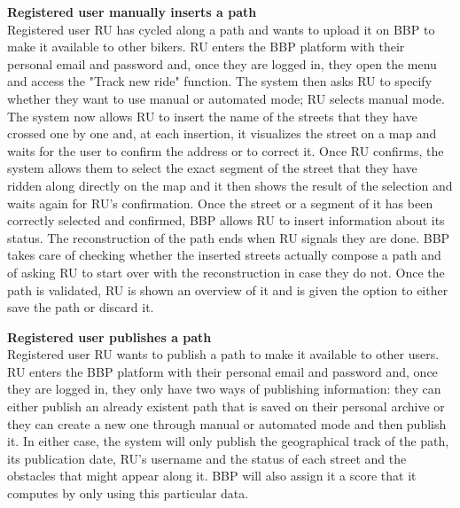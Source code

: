 \documentclass{article}
\begin{document}
\vspace{0.5cm}
\noindent
\textbf{Registered user manually inserts a path} \\
Registered user RU has cycled along a path and wants to upload it on BBP to make it available to other bikers. RU enters the BBP platform with their personal email and password and, once they are logged in, they open the menu and access the "Track new ride" function. The system then asks RU to specify whether they want to use manual or automated mode; RU selects manual mode. The system now allows RU to insert the name of the streets that they have crossed one by one and, at each insertion, it visualizes the street on a map and waits for the user to confirm the address or to correct it. Once RU confirms, the system allows them to select the exact segment of the street that they have ridden along directly on the map and it then shows the result of the selection and waits again for RU's confirmation. Once the street or a segment of it has been correctly selected and confirmed, BBP allows RU to insert information about its status. The reconstruction of the path ends when RU signals they are done. BBP takes care of checking whether the inserted streets actually compose a path and of asking RU to start over with the reconstruction in case they do not. Once the path is validated, RU is shown an overview of it and is given the option to either save the path or discard it. 

\vspace{0.5cm}
\noindent
\textbf{Registered user publishes a path} \\
Registered user RU wants to publish a path to make it available to other users. RU enters the BBP platform with their personal email and password and, once they are logged in, they only have two ways of publishing information: they can either publish an already existent path that is saved on their personal archive or they can create a new one through manual or automated mode and then publish it. In either case, the system will only publish the geographical track of the path, its publication date, RU's username and the status of each street and the obstacles that might appear along it. BBP will also assign it a score that it computes by only using this particular data.
\end{document}
